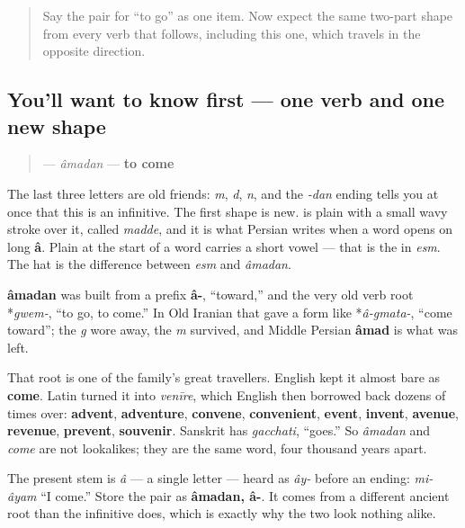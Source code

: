 \label{lesson:FA-C06-amadan}



\begin{quote}
Say the pair for “to go” as one item. Now expect the same two-part shape from every verb that follows, including this one, which travels in the opposite direction.
\end{quote}

\subsection*{You'll want to know first — one verb and one new shape}
\begin{quote}
\textbf{} — \emph{âmadan} — \textbf{to come}
\end{quote}

The last three letters are old friends: \textbf{} \emph{m}, \textbf{} \emph{d}, \textbf{} \emph{n}, and the \emph{-dan} ending tells you at once that this is an infinitive. The first shape is new. \textbf{} is plain \textbf{} with a small wavy stroke over it, called \emph{madde}, and it is what Persian writes when a word opens on long \textbf{â}. Plain \textbf{} at the start of a word carries a short vowel — that is the \textbf{} in \textbf{} \emph{esm}. The hat is the difference between \emph{esm} and \emph{âmadan}.

\begin{cousinweb}
\textbf{âmadan} was built from a prefix \textbf{â-}, “toward,” and the very old verb root *\emph{gwem-}, “to go, to come.” In Old Iranian that gave a form like *\emph{â-gmata-}, “come toward”; the \emph{g} wore away, the \emph{m} survived, and Middle Persian \textbf{âmad} is what was left.

That root is one of the family's great travellers. English kept it almost bare as \textbf{come}. Latin turned it into \emph{venīre}, which English then borrowed back dozens of times over: \textbf{advent}, \textbf{adventure}, \textbf{convene}, \textbf{convenient}, \textbf{event}, \textbf{invent}, \textbf{avenue}, \textbf{revenue}, \textbf{prevent}, \textbf{souvenir}. Sanskrit has \emph{gacchati}, “goes.” So \emph{âmadan} and \emph{come} are not lookalikes; they are the same word, four thousand years apart.

The present stem is \textbf{} \emph{â} — a single letter — heard as \emph{ây-} before an ending: \emph{mi-âyam} “I come.” Store the pair as \textbf{âmadan, â-}. It comes from a different ancient root than the infinitive does, which is exactly why the two look nothing alike.
\end{cousinweb}

